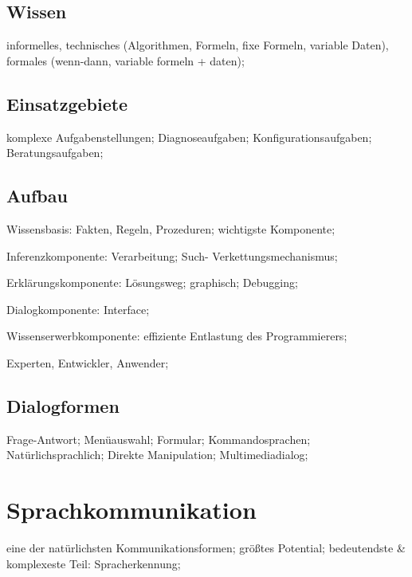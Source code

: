 \documentclass[german,color,6pt]{latex4ei/latex4ei_sheet}
\begin{document}
\begin{sectionbox}
\subsection{Wissen}
informelles, technisches (Algorithmen, Formeln, fixe Formeln, variable Daten), formales (wenn-dann, variable formeln + daten); 
\end{sectionbox}

\begin{sectionbox}
\subsection{Einsatzgebiete}
komplexe Aufgabenstellungen; Diagnoseaufgaben; Konfigurationsaufgaben; Beratungsaufgaben; 
\end{sectionbox}

\begin{sectionbox}
\subsection{Aufbau}
Wissensbasis: Fakten, Regeln, Prozeduren; wichtigste Komponente; 

Inferenzkomponente: Verarbeitung; Such- Verkettungsmechanismus; 

Erklärungskomponente: Lösungsweg; graphisch; Debugging; 

Dialogkomponente: Interface; 

Wissenserwerbkomponente: effiziente Entlastung des Programmierers; 

Experten, Entwickler, Anwender; 
\end{sectionbox}

\begin{sectionbox}
\subsection{Dialogformen}
Frage-Antwort; Menüauswahl; Formular; Kommandosprachen; Natürlichsprachlich; Direkte Manipulation; Multimediadialog; 
\end{sectionbox}

\section{Sprachkommunikation}
\begin{sectionbox}
eine der natürlichsten Kommunikationsformen; größtes Potential; bedeutendste \& komplexeste Teil: Spracherkennung; 
\end{sectionbox}
\end{document}
